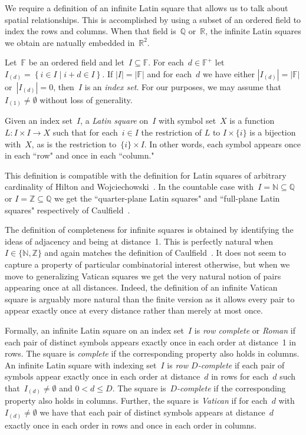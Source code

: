 \documentclass[12pt,a4paper]{article}
\newcommand{\Z}{\mathbb{Z}}
\newcommand{\N}{\mathbb{N}}
\newcommand{\R}{\mathbb{R}}
\newcommand{\Q}{\mathbb{Q}}
\newcommand{\F}{\mathbb{F}}
\newcommand{\st}{\; | \;}
\newcommand{\set}[2]{\left\{#1\st #2 \right\}}
\begin{document}
We require a definition of an infinite Latin square that allows us to talk about spatial relationships.  This is accomplished by using a subset of an ordered field to index the rows and columns.  When that field is~$\Q$ or~$\R$, the infinite Latin squares we obtain are natually embedded in~$\R^2$.

Let~$\F$ be an ordered field and let~$I \subseteq \F$.   For each~$d \in \F^+$ let~$I_{(d)} = \set{ i \in I }{  i+d \in I }$.  If $|I| = |\F|$ and for each~$d$ we have either $|I_{(d)}| = |\F|$ or~$|I_{(d)}| = 0$, then~$I$ is an {\em index set}.   For our purposes, we may assume that~$I_{(1)} \neq \emptyset$ without loss of generality.

Given an index set~$I$, a {\em Latin square} on~$I$ with symbol set~$X$ is a function $L: I \times I \rightarrow X$ such that for each~$i \in I$ the restriction of $L$ to $I \times \{i\}$ is a bijection with~$X$, as is the restriction to~$\{i\} \times I$.   In other words, each symbol appears once in each ``row" and once in each ``column."  

This definition is  compatible with the definition for Latin squares of arbitrary cardinality of Hilton and Wojciechowski~\cite{HW05}.  In the countable case with~$I = \N \subseteq \Q$ or $I = \Z \subseteq \Q$ we get the ``quarter-plane Latin squares" and ``full-plane Latin squares" respectively of Caulfield~\cite{Caulfield96}.




The definition of completeness for infinite squares is obtained by identifying the ideas of adjacency and being at distance~1.  This is perfectly natural when~$I \in \{ \N ,\Z\}$ and again matches the definition of Caulfield~\cite{Caulfield96}.   It does not seem to capture a property of particular combinatorial interest otherwise, but when we move to generalizing Vatican squares we get the very natural notion of pairs appearing once at all distances.  Indeed, the definition of an infinite Vatican square is arguably more natural than the finite version as it allows every pair to appear exactly once at every distance rather than merely at most once.

Formally, an infinite Latin square on an index set~$I$  is {\em row complete} or {\em Roman} if each pair of distinct symbols appears exactly once in each order at distance~1 in rows.  The square is {\em complete} if the corresponding property also holds in columns.   An infinite Latin square with indexing set~$I$ is {\em row $D$-complete} if each pair of symbols appear exactly once in each order at distance~$d$ in rows for each~$d$ such that~$I_{(d)} \neq \emptyset$ and $0 < d \leq D$. The square is~{\em $D$-complete} if the corresponding property also holds in columns. Further, the square is {\em Vatican} if for each~$d$ with~$I_{(d)} \neq \emptyset$ we have that each pair of distinct symbols appears at distance~$d$ exactly once in each order in rows and once in each order in columns.
\end{document}
